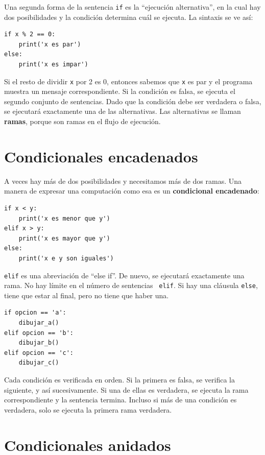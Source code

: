 \documentclass[10pt]{book}
\begin{document}
Una segunda forma de la sentencia {\tt if} es la ``ejecución alternativa'',
en la cual hay dos posibilidades y la condición determina
cuál se ejecuta.  La sintaxis se ve así:

\begin{verbatim}
if x % 2 == 0:
    print('x es par')
else:
    print('x es impar')
\end{verbatim}
%
Si el resto de dividir {\tt x} por 2 es 0, entonces sabemos que
{\tt x} es par y el programa muestra un mensaje correspondiente.  Si
la condición es falsa, se ejecuta el segundo conjunto de sentencias.
Dado que la condición debe ser verdadera o falsa, se ejecutará exactamente
una de las alternativas.  Las alternativas se llaman {\bf
  ramas}, porque son ramas en el flujo de ejecución.



\section{Condicionales encadenados}

A veces hay más de dos posibilidades y necesitamos más de
dos ramas.  Una manera de expresar una computación como esa es un {\bf
condicional encadenado}:

\begin{verbatim}
if x < y:
    print('x es menor que y')
elif x > y:
    print('x es mayor que y')
else:
    print('x e y son iguales')
\end{verbatim}
%
{\tt elif} es una abreviación de ``else if''.  De nuevo, se ejecutará exactamente
una rama.  No hay límite en el número de sentencias {\tt
elif}.  Si hay una cláusula {\tt else}, tiene que estar
al final, pero no tiene que haber una.

\begin{verbatim}
if opcion == 'a':
    dibujar_a()
elif opcion == 'b':
    dibujar_b()
elif opcion == 'c':
    dibujar_c()
\end{verbatim}
%
Cada condición es verificada en orden.  Si la primera es falsa,
se verifica la siguiente, y así sucesivamente.  Si una de ellas es
verdadera, se ejecuta la rama correspondiente y la sentencia
termina.  Incluso si más de una condición es verdadera, solo se ejecuta
la primera rama verdadera.


\section{Condicionales anidados}
\end{document}
